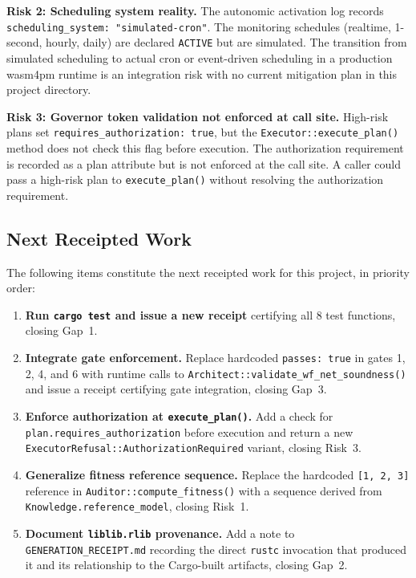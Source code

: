 \textbf{Risk 2: Scheduling system reality.}
The autonomic activation log records \texttt{scheduling\_system:
"simulated-cron"}. The monitoring schedules (realtime, 1-second, hourly, daily)
are declared \texttt{ACTIVE} but are simulated. The transition from simulated
scheduling to actual cron or event-driven scheduling in a production wasm4pm
runtime is an integration risk with no current mitigation plan in this project
directory.

\textbf{Risk 3: Governor token validation not enforced at call site.}
High-risk plans set \texttt{requires\_authorization: true}, but the
\texttt{Executor::execute\_plan()} method does not check this flag before
execution. The authorization requirement is recorded as a plan attribute but
is not enforced at the call site. A caller could pass a high-risk plan to
\texttt{execute\_plan()} without resolving the authorization requirement.

\subsection{Next Receipted Work}
\label{sec:blue-river-dam-questions-next}

The following items constitute the next receipted work for this project, in
priority order:

\begin{enumerate}
  \item \textbf{Run \texttt{cargo test} and issue a new receipt} certifying all
    8 test functions, closing Gap~1.
  \item \textbf{Integrate gate enforcement.} Replace hardcoded \texttt{passes:
    true} in gates 1, 2, 4, and 6 with runtime calls to
    \texttt{Architect::validate\_wf\_net\_soundness()} and issue a receipt
    certifying gate integration, closing Gap~3.
  \item \textbf{Enforce authorization at \texttt{execute\_plan()}.} Add a
    check for \texttt{plan.requires\_authorization} before execution and
    return a new \texttt{ExecutorRefusal::AuthorizationRequired} variant,
    closing Risk~3.
  \item \textbf{Generalize fitness reference sequence.} Replace the hardcoded
    \texttt{[1, 2, 3]} reference in \texttt{Auditor::compute\_fitness()} with a
    sequence derived from \texttt{Knowledge.reference\_model}, closing Risk~1.
  \item \textbf{Document \texttt{liblib.rlib} provenance.} Add a note to
    \texttt{GENERATION\_RECEIPT.md} recording the direct \texttt{rustc}
    invocation that produced it and its relationship to the Cargo-built
    artifacts, closing Gap~2.
\end{enumerate}
